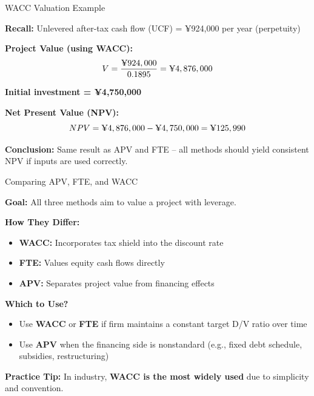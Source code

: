 \begin{frame}{WACC Valuation Example}
	
	\textbf{Recall:} Unlevered after-tax cash flow (UCF) = ¥924,000 per year (perpetuity)
	
	\vspace{0.2cm}
	\textbf{Project Value (using WACC):}
	\[
	V = \frac{\text{\textyen}924,000}{0.1895} = \text{\textyen}4,876,000
	\]
	
	\textbf{Initial investment = ¥4,750,000}
	
	\vspace{0.3cm}
	\textbf{Net Present Value (NPV):}
	\[
	NPV = \text{\textyen}4,876,000 - \text{\textyen}4,750,000 = \text{\textyen}125,990
	\]
	
	\vspace{0.2cm}
	\textbf{Conclusion:}  
	Same result as APV and FTE -- all methods should yield consistent NPV if inputs are used correctly.
	
\end{frame}
\begin{frame}{Comparing APV, FTE, and WACC}
	
	\textbf{Goal:} All three methods aim to value a project with leverage.
	
	\vspace{0.3cm}
	\textbf{How They Differ:}
	\begin{itemize}
		\item \textbf{WACC:} Incorporates tax shield into the discount rate
		\item \textbf{FTE:} Values equity cash flows directly
		\item \textbf{APV:} Separates project value from financing effects
	\end{itemize}
	
	\vspace{0.3cm}
	\textbf{Which to Use?}
	\begin{itemize}
		\item Use \textbf{WACC} or \textbf{FTE} if firm maintains a constant target D/V ratio over time
		\item Use \textbf{APV} when the financing side is nonstandard (e.g., fixed debt schedule, subsidies, restructuring)
	\end{itemize}
	
	\vspace{0.3cm}
	\textbf{Practice Tip:}  
	In industry, \textbf{WACC is the most widely used} due to simplicity and convention.
	
\end{frame}

